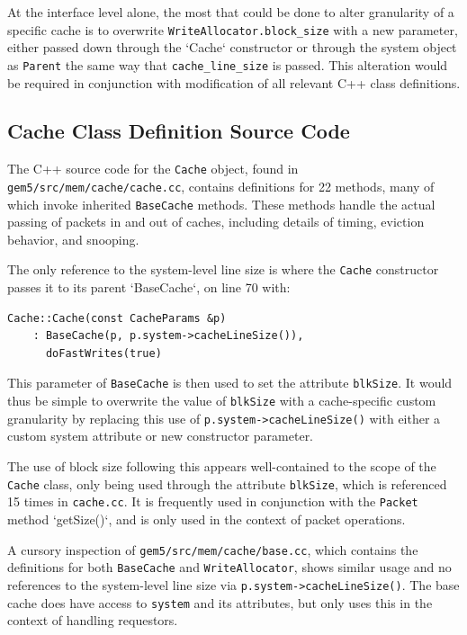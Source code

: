 \documentclass[12pt,twoside]{reedthesis}
\begin{document}
	At the interface level alone, the most that could be done to alter granularity of a specific cache is to overwrite \verb`WriteAllocator.block_size` with a new parameter, either passed down through the `Cache` constructor or through the system object as \verb`Parent` the same way that \verb`cache_line_size` is passed. This alteration would be required in conjunction with modification of all relevant C++ class definitions.

	\subsection*{Cache Class Definition Source Code}

	The C++ source code for the \verb`Cache` object, found in \verb`gem5/src/mem/cache/cache.cc`, contains definitions for 22 methods, many of which invoke inherited \verb`BaseCache` methods. These methods handle the actual passing of packets in and out of caches, including details of timing, eviction behavior, and snooping.

	The only reference to the system-level line size is where the \verb`Cache` constructor passes it to its parent `BaseCache`, on line 70 with:
	\begin{verbatim}
Cache::Cache(const CacheParams &p)
    : BaseCache(p, p.system->cacheLineSize()),
      doFastWrites(true)
	\end{verbatim}
	This parameter of \verb`BaseCache` is then used to set the attribute \verb`blkSize`. It would thus be simple to overwrite the value of \verb`blkSize` with a cache-specific custom granularity by replacing this use of \verb`p.system->cacheLineSize()` with either a custom system attribute or new constructor parameter.

	The use of block size following this appears well-contained to the scope of the \verb`Cache` class, only being used through the attribute \verb`blkSize`, which is referenced 15 times in \verb`cache.cc`. It is frequently used in conjunction with the \verb`Packet` method `getSize()`, and is only used in the context of packet operations.
	
	A cursory inspection of \verb`gem5/src/mem/cache/base.cc`, which contains the definitions for both \verb`BaseCache` and \verb`WriteAllocator`, shows similar usage and no references to the system-level line size via \verb`p.system->cacheLineSize()`. The base cache does have access to \verb`system` and its attributes, but only uses this in the context of handling requestors.
	
\end{document}
